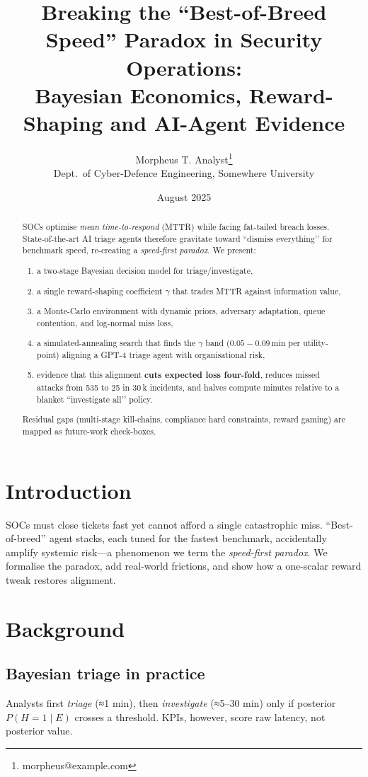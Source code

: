 \documentclass[11pt]{article}
\title{\bfseries
Breaking the ``Best-of-Breed Speed'' Paradox in Security Operations:\\
Bayesian Economics, Reward-Shaping and AI-Agent Evidence
}
\author{Morpheus T. Analyst\thanks{morpheus@example.com}\\
\small Dept.\ of Cyber-Defence Engineering, Somewhere University}
\date{August 2025}
\begin{document}
\maketitle\vspace{-1.5em}

\begin{abstract}
SOCs optimise \emph{mean time-to-respond} (MTTR) while facing fat-tailed breach losses.
State-of-the-art AI triage agents therefore gravitate toward ``dismiss everything’’
for benchmark speed, re-creating a \textit{speed-first paradox}.
We present:
\begin{enumerate}
\item a two-stage Bayesian decision model for triage/investigate,
\item a single reward-shaping coefficient $\gamma$ that trades MTTR against
    information value,
\item a Monte-Carlo environment with dynamic priors, adversary adaptation,
    queue contention, and log-normal miss loss,
\item a simulated-annealing search that finds the $\gamma$ band
    ($0.05\!-\!0.09$\,min per utility-point) aligning a GPT-4 triage agent
    with organisational risk,
\item evidence that this alignment \textbf{cuts expected loss four-fold},
    reduces missed attacks from 535 to 25 in 30 k incidents, and halves
    compute minutes relative to a blanket ``investigate all’’ policy.
\end{enumerate}
Residual gaps (multi-stage kill-chains, compliance hard constraints,
reward gaming) are mapped as future-work check-boxes.
\end{abstract}

\section{Introduction}
\label{sec:intro}
SOCs must close tickets fast yet cannot afford a single catastrophic miss.
``Best-of-breed’’ agent stacks, each tuned for the fastest benchmark,
accidentally amplify systemic risk—a phenomenon we term the
\emph{speed-first paradox}.
We formalise the paradox, add real-world frictions, and show how a
one-scalar reward tweak restores alignment.

\section{Background}
\subsection{Bayesian triage in practice}
Analysts first \emph{triage} (≈1 min), then \emph{investigate}
(≈5–30 min) only if posterior $P(H\!=\!1\mid E)$ crosses a threshold.
KPIs, however, score raw latency, not posterior value.
\end{document}
